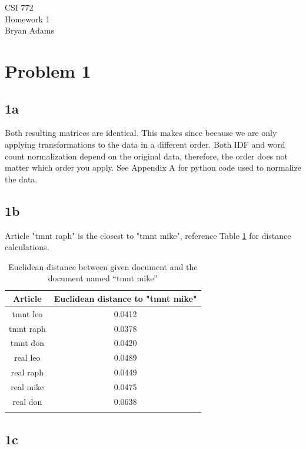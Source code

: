 \documentclass[12pt]{article}
\begin{document}
CSI 772 \\
Homework 1 \\
Bryan Adams 

\section*{Problem 1}

\subsection*{1a}

Both resulting matrices are identical. This makes since because we are only applying transformations to the data in a different order. Both IDF and word count normalization depend on the original data, therefore, the order does not matter which order you apply. See Appendix A for python code used to normalize the data.

\subsection*{1b}

Article "tmnt raph" is the closest to "tmnt mike", reference Table \ref{tmnt_mike} for distance calculations.

\begin{table}[h!]
    \centering
    \caption{Euclidean distance between given document and the document named “tmnt mike”}
    \vspace*{4mm}
    \label{tmnt_mike}
    \begin{tabular}{c|c}
        \Xhline{3\arrayrulewidth}
        Article & Euclidean distance to "tmnt mike" \\\hline
        tmnt leo & 0.0412 \\
        tmnt raph& 0.0378 \\
        tmnt don & 0.0420 \\
        real leo & 0.0489 \\
        real raph& 0.0449 \\
        real mike& 0.0475 \\
        real don & 0.0638 \\
        \Xhline{3\arrayrulewidth}
    \end{tabular}
\end{table}

\subsection*{1c}
\end{document}
